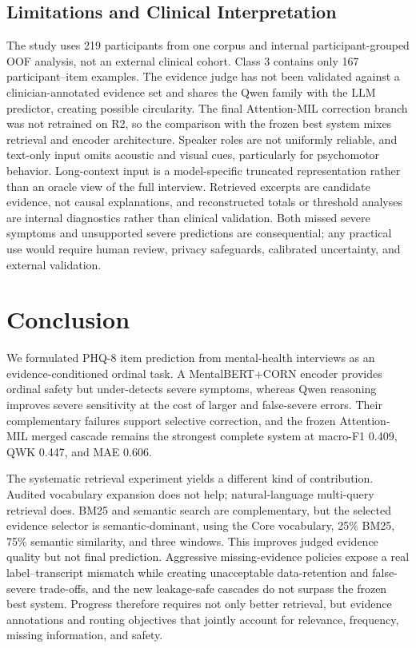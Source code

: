 \documentclass{article}
\begin{document}
\subsection{Limitations and Clinical Interpretation}
The study uses 219 participants from one corpus and internal participant-grouped OOF analysis, not an external clinical cohort. Class 3 contains only 167 participant--item examples. The evidence judge has not been validated against a clinician-annotated evidence set and shares the Qwen family with the LLM predictor, creating possible circularity. The final Attention-MIL correction branch was not retrained on R2, so the comparison with the frozen best system mixes retrieval and encoder architecture. Speaker roles are not uniformly reliable, and text-only input omits acoustic and visual cues, particularly for psychomotor behavior. Long-context input is a model-specific truncated representation rather than an oracle view of the full interview. Retrieved excerpts are candidate evidence, not causal explanations, and reconstructed totals or threshold analyses are internal diagnostics rather than clinical validation. Both missed severe symptoms and unsupported severe predictions are consequential; any practical use would require human review, privacy safeguards, calibrated uncertainty, and external validation.

\section{Conclusion}
\label{sec:conclusion}
We formulated PHQ-8 item prediction from mental-health interviews as an evidence-conditioned ordinal task. A MentalBERT+CORN encoder provides ordinal safety but under-detects severe symptoms, whereas Qwen reasoning improves severe sensitivity at the cost of larger and false-severe errors. Their complementary failures support selective correction, and the frozen Attention-MIL merged cascade remains the strongest complete system at macro-F1 0.409, QWK 0.447, and MAE 0.606.

The systematic retrieval experiment yields a different kind of contribution. Audited vocabulary expansion does not help; natural-language multi-query retrieval does. BM25 and semantic search are complementary, but the selected evidence selector is semantic-dominant, using the Core vocabulary, 25\% BM25, 75\% semantic similarity, and three windows. This improves judged evidence quality but not final prediction. Aggressive missing-evidence policies expose a real label--transcript mismatch while creating unacceptable data-retention and false-severe trade-offs, and the new leakage-safe cascades do not surpass the frozen best system. Progress therefore requires not only better retrieval, but evidence annotations and routing objectives that jointly account for relevance, frequency, missing information, and safety.
\end{document}
